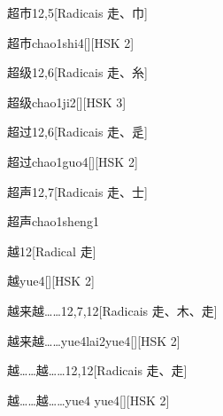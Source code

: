 \begin{entry}{超市}{12,5}[Radicais ⾛、⼱]
  \begin{phonetics}{超市}{chao1shi4}[][HSK 2]
  \end{phonetics}
\end{entry}

\begin{entry}{超级}{12,6}[Radicais ⾛、⽷]
  \begin{phonetics}{超级}{chao1ji2}[][HSK 3]
  \end{phonetics}
\end{entry}

\begin{entry}{超过}{12,6}[Radicais ⾛、⾡]
  \begin{phonetics}{超过}{chao1guo4}[][HSK 2]
  \end{phonetics}
\end{entry}

\begin{entry}{超声}{12,7}[Radicais ⾛、⼠]
  \begin{phonetics}{超声}{chao1sheng1}
  \end{phonetics}
\end{entry}

\begin{entry}{越}{12}[Radical ⾛]
  \begin{phonetics}{越}{yue4}[][HSK 2]
  \end{phonetics}
\end{entry}

\begin{entry}{越来越……}{12,7,12}[Radicais ⾛、⽊、⾛]
  \begin{phonetics}{越来越……}{yue4lai2yue4}[][HSK 2]
  \end{phonetics}
\end{entry}

\begin{entry}{越……越……}{12,12}[Radicais ⾛、⾛]
  \begin{phonetics}{越……越……}{yue4 yue4}[][HSK 2]
  \end{phonetics}
\end{entry}

